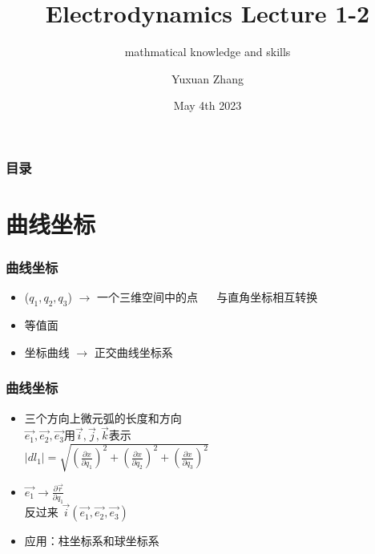\documentclass[10pt]{beamer}
\title[About Beamer] %
{Electrodynamics Lecture 1-2}
\subtitle{mathmatical knowledge and skills}
\author %
{Yuxuan Zhang }
\institute[VFU] %
{
  School of Physics \quad
  Zhejiang University
}
\date[VLC 2021] %
{May 4th 2023}
\begin{document}
\frame{\titlepage}

\begin{frame}
    \frametitle{目录}
    \tableofcontents
\end{frame}
\section{曲线坐标}
\begin{frame}
\frametitle{曲线坐标}
\begin{itemize}
    \item ($q_1,q_2,q_3$) $\rightarrow$ 一个三维空间中的点 $\quad$ 与直角坐标相互转换
    \item 等值面
    \item 坐标曲线 $\rightarrow$ 正交曲线坐标系
\end{itemize}
\end{frame}

\begin{frame}
    \frametitle{曲线坐标}
    \begin{itemize}
        \item 三个方向上微元弧的长度和方向\\
        $\vec{e_1},\vec{e_2},\vec{e_3}$用$\vec{i},\vec{j},\vec{k}$表示\\
        $|dl_1| = \sqrt{\left( \frac{\partial x}{\partial q_1}\right)^2+\left( \frac{\partial x}{\partial q_2}\right)^2+\left( \frac{\partial x}{\partial q_3}\right)^2}$

        \item $\vec{e_1} \rightarrow \frac{\partial \vec{r}}{\partial q_1}$\\
        反过来 $\vec{i} (\vec{e_1},\vec{e_2},\vec{e_3})$
        \item 应用：柱坐标系和球坐标系
    \end{itemize}
\end{frame}
\end{document}
